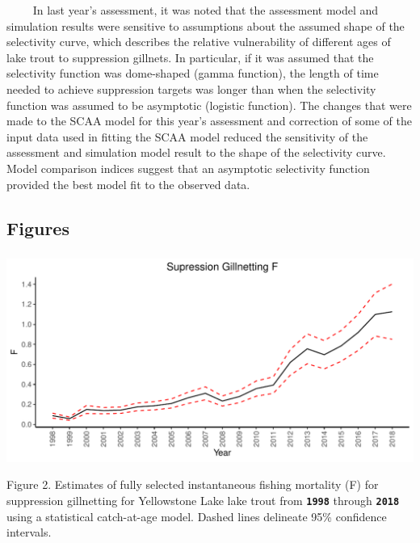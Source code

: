 \documentclass[
]{article}
\begin{document}
~~~~ In last year's assessment, it was noted that the assessment model
and simulation results were sensitive to assumptions about the assumed
shape of the selectivity curve, which describes the relative
vulnerability of different ages of lake trout to suppression gillnets.
In particular, if it was assumed that the selectivity function was
dome-shaped (gamma function), the length of time needed to achieve
suppression targets was longer than when the selectivity function was
assumed to be asymptotic (logistic function). The changes that were made
to the SCAA model for this year's assessment and correction of some of
the input data used in fitting the SCAA model reduced the sensitivity of
the assessment and simulation model result to the shape of the
selectivity curve. Model comparison indices suggest that an asymptotic
selectivity function provided the best model fit to the observed data.

\pagebreak
\singlespace

\hypertarget{figures}{%
\subsection{Figures}\label{figures}}

\hypertarget{fig2}{%
\subsubsection{}\label{fig2}}

\includegraphics{Yellowstone-import-code_files/figure-latex/unnamed-chunk-2-1.pdf}

Figure 2. Estimates of fully selected instantaneous fishing mortality
(F) for suppression gillnetting for Yellowstone Lake lake trout from
\textbf{\texttt{1998}} through \textbf{\texttt{2018}} using a
statistical catch-at-age model. Dashed lines delineate 95\% confidence
intervals. \newline \newline \newline
\end{document}
